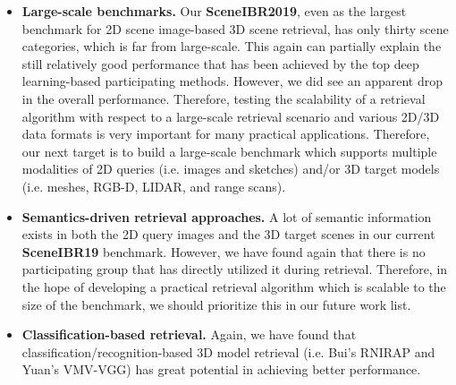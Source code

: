 \documentclass[../main.tex]{subfiles}
\begin{document}
\begin{itemize}
	
	\item \textbf{Large-scale benchmarks.} Our \textbf{SceneIBR2019}, even as 
	the largest benchmark for 2D scene image-based 3D scene retrieval, has only 
	thirty scene categories, which is far from large-scale. This again can 
	partially explain the still relatively good performance that has been 
	achieved by the top deep learning-based participating methods. However, we 
	did see an apparent drop in the overall performance. Therefore, testing the 
	scalability of a retrieval algorithm with respect to a large-scale 
	retrieval scenario and various 2D/3D data formats is very important for 
	many practical applications. Therefore, our next target is to build a 
	large-scale benchmark which supports multiple modalities of 2D queries 
	(i.e. images and sketches) and/or 3D target models (i.e. meshes, RGB-D, 
	LIDAR, and range scans).
	
	\item \textbf{Semantics-driven retrieval approaches.} A lot of semantic information exists in both the 2D query images and the 3D target scenes in our current \textbf{SceneIBR19} benchmark. However, we have found again that there is no participating group that has directly utilized it during retrieval. Therefore, in the hope of developing a practical retrieval algorithm which is scalable to the size of the benchmark, we should prioritize this in our future work list.
	
	\item \textbf{Classification-based retrieval.} Again, we have found that classification/recognition-based 3D model retrieval (i.e. Bui's RNIRAP and Yuan's VMV-VGG) has great potential in achieving better performance.
	
	
\end{itemize}
\end{document}

